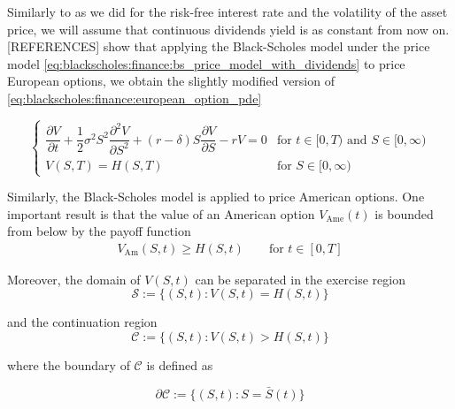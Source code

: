 Similarly to
as we did for the risk-free interest rate and the volatility of the asset price,
we will assume that continuous dividends yield is as constant from now on. [REFERENCES]
show that applying the Black-Scholes model under the price model \eqref{eq:blackscholes:finance:bs_price_model_with_dividends} to price European options,
we obtain the slightly modified version of \eqref{eq:blackscholes:finance:european_option_pde}

\begin{equation}
  \begin{cases}
    \dfrac{\partial{V}}{\partial{t}} + \dfrac{1}{2}\sigma^{2} S^2 \dfrac{\partial^2{V}}{\partial{S^2}} + (r - \delta) S \dfrac{\partial{V}}{\partial{S}} - rV = 0 & \text{for $t\in[0,T)$ and $S\in[0, \infty)$} \\
    V(S, T) = H(S, T) & \text{for $S\in[0, \infty)$}
  \end{cases}
  \label{eq:chapter2:european_option_pde_with_dividens}
\end{equation}
 
Similarly, the Black-Scholes model is applied to price American options. 
One important result is that the value of an American option $V_\text{Ame}(t)$ is
bounded from below by the payoff function
\begin{align}
  V_{\text{Am}}(S, t) \ge H(S, t) \qquad \text{for $t\in[0,T]$}
  \label{eq:blackscholes:american_options_price_lower_bound}
\end{align}

Moreover, the domain of $V(S,t)$ can be separated in the exercise region 
\begin{equation}
  \mathcal{S} := \{(S, t): V(S, t) = H(S, t) \}
  \label{eq:background:finance:exercise_region}
\end{equation}

and the continuation region 
\begin{equation}
  \mathcal{C} := \{(S, t): V(S, t) > H(S, t) \}
\end{equation}

where the boundary of $\mathcal{C}$ is defined as

\begin{equation}
  \partial \mathcal{C} := \{(S, t): S = \bar{S}(t)\} 
  \label{eq:background:finance:exercise_region}
\end{equation}

